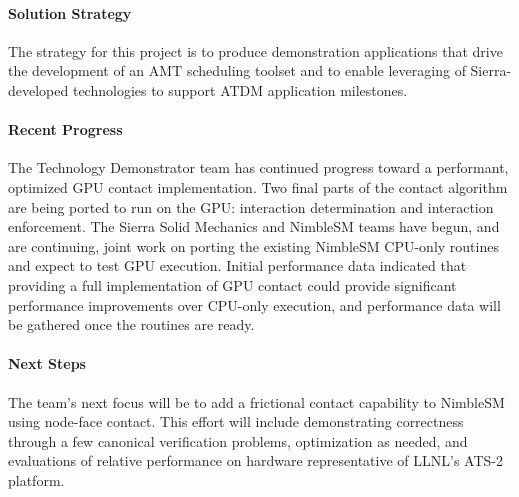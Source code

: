 \paragraph{Solution Strategy}

The strategy for this project is to produce demonstration applications
that drive the development of an AMT scheduling toolset and to enable
leveraging of Sierra-developed technologies to support ATDM
application milestones.

\paragraph{Recent Progress}

The Technology Demonstrator team has continued progress toward a 
performant, optimized GPU contact implementation. 
Two final parts of the contact algorithm are being ported to run on the GPU: 
interaction determination and interaction enforcement. The Sierra Solid 
Mechanics and NimbleSM teams have begun, and are continuing, joint work on 
porting the existing NimbleSM CPU-only routines and expect to test GPU 
execution. Initial performance data indicated that providing a full 
implementation of GPU contact could provide significant performance 
improvements over CPU-only execution, and performance data will be 
gathered once the routines are ready.

\paragraph{Next Steps}

The team's next focus will be to add a frictional contact capability to 
NimbleSM using node-face contact. This effort will include demonstrating 
correctness through a few canonical verification problems, optimization
 as needed, and evaluations of relative performance on hardware 
representative of LLNL's ATS-2 platform.

